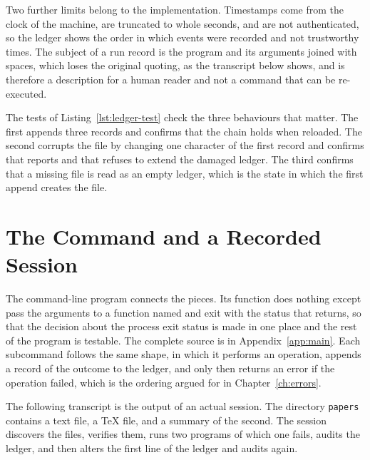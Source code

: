Two further limits belong to the implementation. Timestamps come from the clock of the machine, are truncated to whole seconds, and are not authenticated, so the ledger shows the order in which events were recorded and not trustworthy times. The subject of a run record is the program and its arguments joined with spaces, which loses the original quoting, as the transcript below shows, and is therefore a description for a human reader and not a command that can be re-executed.


The tests of Listing~\ref{lst:ledger-test} check the three behaviours that matter. The first appends three records and confirms that the chain holds when reloaded. The second corrupts the file by changing one character of the first record and confirms that  reports  and that  refuses to extend the damaged ledger. The third confirms that a missing file is read as an empty ledger, which is the state in which the first append creates the file.

\section{The Command and a Recorded Session}

The command-line program connects the pieces. Its  function does nothing except pass the arguments to a function named  and exit with the status that  returns, so that the decision about the process exit status is made in one place and the rest of the program is testable. The complete source is in Appendix~\ref{app:main}. Each subcommand follows the same shape, in which it performs an operation, appends a record of the outcome to the ledger, and only then returns an error if the operation failed, which is the ordering argued for in Chapter~\ref{ch:errors}.

The following transcript is the output of an actual session. The directory \texttt{papers} contains a text file, a \TeX{} file, and a summary of the second. The session discovers the files, verifies them, runs two programs of which one fails, audits the ledger, and then alters the first line of the ledger and audits again.



